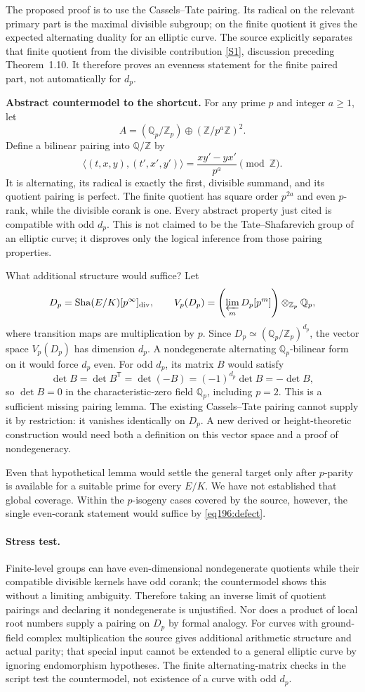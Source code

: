 \documentclass[11pt,a4paper]{article}
\newcommand{\Z}{\mathbb{Z}}
\newcommand{\Q}{\mathbb{Q}}
\newcommand{\sref}[2]{\hyperlink{source:#1:#2}{[S#2]}}
\numberwithin{equation}{section}
\begin{document}
The proposed proof is to use the Cassels--Tate pairing. Its radical on the relevant primary part is the maximal divisible subgroup; on the finite quotient it gives the expected alternating duality for an elliptic curve. The source explicitly separates that finite quotient from the divisible contribution \sref{196}{1}, discussion preceding Theorem~1.10. It therefore proves an evenness statement for the finite paired part, not automatically for $d_p$.

\textbf{Abstract countermodel to the shortcut.} For any prime $p$ and integer $a\ge1$, let
\[
 A=(\Q_p/\Z_p)\oplus(\Z/p^a\Z)^2.
\]
Define a bilinear pairing into $\Q/\Z$ by
\[
 \langle(t,x,y),(t',x',y')\rangle=\frac{xy'-yx'}{p^a}\pmod\Z.
\]
It is alternating, its radical is exactly the first, divisible summand, and its quotient pairing is perfect. The finite quotient has square order $p^{2a}$ and even $p$-rank, while the divisible corank is one. Every abstract property just cited is compatible with odd $d_p$. This is not claimed to be the Tate--Shafarevich group of an elliptic curve; it disproves only the logical inference from those pairing properties.

What additional structure would suffice? Let
\[
 D_p=\operatorname{Sha}(E/K)[p^\infty]_{\rm div},\qquad
 V_p(D_p)=\left(\varprojlim_m D_p[p^m]\right)\otimes_{\Z_p}\Q_p,
\]
where transition maps are multiplication by $p$. Since
$D_p\simeq(\Q_p/\Z_p)^{d_p}$, the vector space $V_p(D_p)$ has dimension $d_p$. A nondegenerate alternating $\Q_p$-bilinear form on it would force $d_p$ even. For odd $d_p$, its matrix $B$ would satisfy
\[
 \det B=\det B^{\mathsf T}=\det(-B)=(-1)^{d_p}\det B=-\det B,
\]
so $\det B=0$ in the characteristic-zero field $\Q_p$, including $p=2$. This is a sufficient missing pairing lemma. The existing Cassels--Tate pairing cannot supply it by restriction: it vanishes identically on $D_p$. A new derived or height-theoretic construction would need both a definition on this vector space and a proof of nondegeneracy.

Even that hypothetical lemma would settle the general target only after $p$-parity is available for a suitable prime for every $E/K$. We have not established that global coverage. Within the $p$-isogeny cases covered by the source, however, the single even-corank statement would suffice by \eqref{eq196:defect}.

\paragraph{Stress test.}
Finite-level groups can have even-dimensional nondegenerate quotients while their compatible divisible kernels have odd corank; the countermodel shows this without a limiting ambiguity. Therefore taking an inverse limit of quotient pairings and declaring it nondegenerate is unjustified. Nor does a product of local root numbers supply a pairing on $D_p$ by formal analogy. For curves with ground-field complex multiplication the source gives additional arithmetic structure and actual parity; that special input cannot be extended to a general elliptic curve by ignoring endomorphism hypotheses. The finite alternating-matrix checks in the script test the countermodel, not existence of a curve with odd $d_p$.
\end{document}
